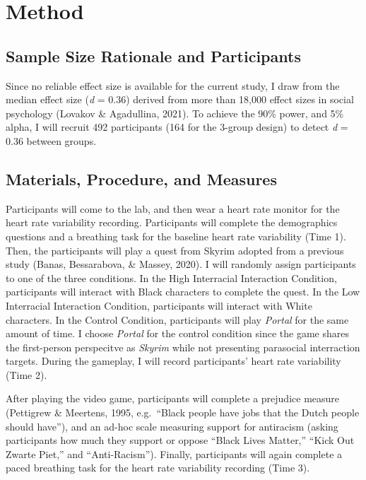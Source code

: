 \documentclass[
  english,
  man, noextraspace,floatsintext]{apa6}
\begin{document}
\hypertarget{method}{%
\section{Method}\label{method}}

\hypertarget{sample-size-rationale-and-participants}{%
\subsection{Sample Size Rationale and Participants}\label{sample-size-rationale-and-participants}}

Since no reliable effect size is available for the current study, I draw from the median effect size (\emph{d} = 0.36) derived from more than 18,000 effect sizes in social psychology (Lovakov \& Agadullina, 2021). To achieve the 90\% power, and 5\% alpha, I will recruit 492 participants (164 for the 3-group design) to detect \emph{d} = 0.36 between groups.

\hypertarget{materials-procedure-and-measures}{%
\subsection{Materials, Procedure, and Measures}\label{materials-procedure-and-measures}}

Participants will come to the lab, and then wear a heart rate monitor for the heart rate variability recording. Participants will complete the demographics questions and a breathing task for the baseline heart rate variability (Time 1). Then, the participants will play a quest from Skyrim adopted from a previous study (Banas, Bessarabova, \& Massey, 2020). I will randomly assign participants to one of the three conditions. In the High Interracial Interaction Condition, participants will interact with Black characters to complete the quest. In the Low Interracial Interaction Condition, participants will interact with White characters. In the Control Condition, participants will play \emph{Portal} for the same amount of time. I choose \emph{Portal} for the control condition since the game shares the first-person perspecitve as \emph{Skyrim} while not presenting parasocial interraction targets. During the gameplay, I will record participants' heart rate variability (Time 2).

After playing the video game, participants will complete a prejudice measure (Pettigrew \& Meertens, 1995, e.g.~{``Black people have jobs that the Dutch people should have''}), and an ad-hoc scale measuring support for antiracism (asking participants how much they support or oppose ``Black Lives Matter,'' ``Kick Out Zwarte Piet,'' and ``Anti-Racism''). Finally, participants will again complete a paced breathing task for the heart rate variability recording (Time 3).
\end{document}
